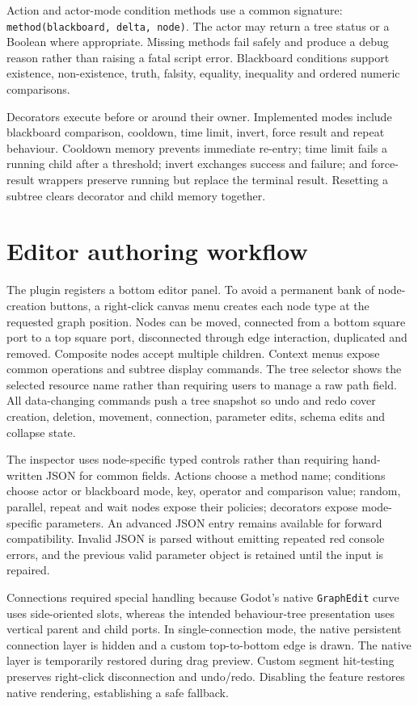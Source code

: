 Action and actor-mode condition methods use a common signature: \texttt{method(blackboard, delta, node)}. The actor may return a tree status or a Boolean where appropriate. Missing methods fail safely and produce a debug reason rather than raising a fatal script error. Blackboard conditions support existence, non-existence, truth, falsity, equality, inequality and ordered numeric comparisons.

Decorators execute before or around their owner. Implemented modes include blackboard comparison, cooldown, time limit, invert, force result and repeat behaviour. Cooldown memory prevents immediate re-entry; time limit fails a running child after a threshold; invert exchanges success and failure; and force-result wrappers preserve running but replace the terminal result. Resetting a subtree clears decorator and child memory together.

\section{Editor authoring workflow}

The plugin registers a bottom editor panel. To avoid a permanent bank of node-creation buttons, a right-click canvas menu creates each node type at the requested graph position. Nodes can be moved, connected from a bottom square port to a top square port, disconnected through edge interaction, duplicated and removed. Composite nodes accept multiple children. Context menus expose common operations and subtree display commands. The tree selector shows the selected resource name rather than requiring users to manage a raw path field. All data-changing commands push a tree snapshot so undo and redo cover creation, deletion, movement, connection, parameter edits, schema edits and collapse state.

The inspector uses node-specific typed controls rather than requiring hand-written JSON for common fields. Actions choose a method name; conditions choose actor or blackboard mode, key, operator and comparison value; random, parallel, repeat and wait nodes expose their policies; decorators expose mode-specific parameters. An advanced JSON entry remains available for forward compatibility. Invalid JSON is parsed without emitting repeated red console errors, and the previous valid parameter object is retained until the input is repaired.

Connections required special handling because Godot's native \texttt{GraphEdit} curve uses side-oriented slots, whereas the intended behaviour-tree presentation uses vertical parent and child ports. In single-connection mode, the native persistent connection layer is hidden and a custom top-to-bottom edge is drawn. The native layer is temporarily restored during drag preview. Custom segment hit-testing preserves right-click disconnection and undo/redo. Disabling the feature restores native rendering, establishing a safe fallback.


